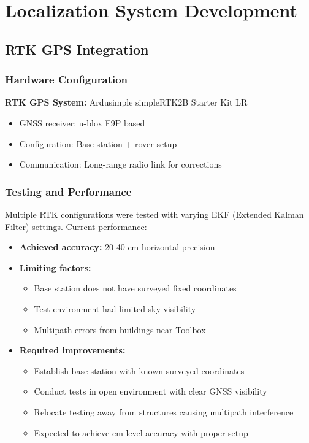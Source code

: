 \section{Localization System Development}

\subsection{RTK GPS Integration}

\subsubsection{Hardware Configuration}
\textbf{RTK GPS System:} Ardusimple simpleRTK2B Starter Kit LR
\begin{itemize}
    \item GNSS receiver: u-blox F9P based
    \item Configuration: Base station + rover setup
    \item Communication: Long-range radio link for corrections
\end{itemize}

\subsubsection{Testing and Performance}
Multiple RTK configurations were tested with varying EKF (Extended Kalman Filter) settings. Current performance:
\begin{itemize}
    \item \textbf{Achieved accuracy:} 20-40 cm horizontal precision
    \item \textbf{Limiting factors:}
    \begin{itemize}
        \item Base station does not have surveyed fixed coordinates
        \item Test environment had limited sky visibility
        \item Multipath errors from buildings near Toolbox
    \end{itemize}
    \item \textbf{Required improvements:}
    \begin{itemize}
        \item Establish base station with known surveyed coordinates
        \item Conduct tests in open environment with clear GNSS visibility
        \item Relocate testing away from structures causing multipath interference
        \item Expected to achieve cm-level accuracy with proper setup
    \end{itemize}
\end{itemize}

